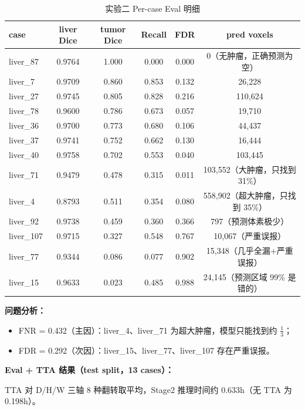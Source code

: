 \documentclass{article}
\begin{document}
	\begin{table}[H]
		\centering
		\small
		\caption{实验二 Per-case Eval 明细}
		\begin{tabular}{lccccc}
			\hline
			\textbf{case} & \textbf{liver Dice} & \textbf{tumor Dice} & \textbf{Recall} & \textbf{FDR} & \textbf{pred voxels} \\
			\hline
			liver\_87  & 0.9764 & 1.000 & 0.000 & 0.000 & 0（无肿瘤，正确预测为空） \\
			liver\_7   & 0.9709 & 0.860 & 0.853 & 0.132 & 26{,}228 \\
			liver\_27  & 0.9745 & 0.805 & 0.828 & 0.216 & 110{,}624 \\
			liver\_78  & 0.9600 & 0.786 & 0.673 & 0.057 & 19{,}710 \\
			liver\_36  & 0.9700 & 0.773 & 0.680 & 0.106 & 44{,}437 \\
			liver\_37  & 0.9741 & 0.752 & 0.662 & 0.130 & 16{,}444 \\
			liver\_40  & 0.9758 & 0.702 & 0.553 & 0.040 & 103{,}445 \\
			liver\_71  & 0.9479 & 0.478 & 0.315 & 0.011 & 103{,}552（大肿瘤，只找到 31\%） \\
			liver\_4   & 0.8793 & 0.511 & 0.354 & 0.080 & 558{,}902（超大肿瘤，只找到 35\%） \\
			liver\_92  & 0.9738 & 0.459 & 0.360 & 0.366 & 797（预测体素极少） \\
			liver\_107 & 0.9715 & 0.327 & 0.548 & 0.767 & 10{,}067（严重误报） \\
			liver\_77  & 0.9344 & 0.086 & 0.077 & 0.902 & 15{,}348（几乎全漏+严重误报） \\
			liver\_15  & 0.9633 & 0.023 & 0.485 & 0.988 & 24{,}145（预测区域 99\% 是错的） \\
			\hline
		\end{tabular}
	\end{table}
	
	\noindent\textbf{问题分析：}
	\begin{itemize}
		\item FNR = 0.432（主因）：liver\_4、liver\_71 为超大肿瘤，模型只能找到约 $\frac{1}{3}$；
		\item FDR = 0.292（次因）：liver\_15、liver\_77、liver\_107 存在严重误报。
	\end{itemize}

	\noindent\textbf{Eval + TTA 结果（test split，13 cases）：}

	\noindent TTA 对 D/H/W 三轴 8 种翻转取平均，Stage2 推理时间约 0.633h（无 TTA 为 0.198h）。
\end{document}
